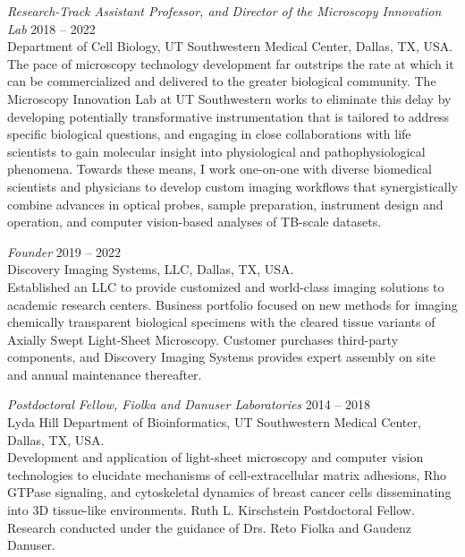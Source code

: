 {\sl Research-Track Assistant Professor, and Director of the Microscopy Innovation Lab} \hfill 2018 -- 2022 \\ 
Department of Cell Biology, UT Southwestern Medical Center, Dallas, TX, USA. \hfill \\
\forceindent The pace of microscopy technology development far outstrips the rate at which it can be commercialized and delivered to the greater biological community.  The Microscopy Innovation Lab at UT Southwestern works to eliminate this delay by developing potentially transformative instrumentation that is tailored to address specific biological questions, and engaging in close collaborations with life scientists to gain molecular insight into physiological and pathophysiological phenomena. Towards these means, I work one-on-one with diverse biomedical scientists and physicians to develop custom imaging workflows that synergistically combine advances in optical probes, sample preparation, instrument design and operation, and computer vision-based analyses of TB-scale datasets. 

{\sl Founder} \hfill 2019 -- 2022 \\ 
Discovery Imaging Systems, LLC, Dallas, TX, USA. \hfill \\
\forceindent Established an LLC to provide customized and world-class imaging solutions to academic research centers.  Business portfolio focused on new methods for imaging chemically transparent biological specimens with the cleared tissue variants of Axially Swept Light-Sheet Microscopy.  Customer purchases third-party components, and Discovery Imaging Systems provides expert assembly on site and annual maintenance thereafter.

{\sl Postdoctoral Fellow, Fiolka and Danuser Laboratories} \hfill 2014 -- 2018 \\ 
Lyda Hill Department of Bioinformatics, UT Southwestern Medical Center, Dallas, TX, USA. \hfill \\
\forceindent Development and application of light-sheet microscopy and computer vision technologies to elucidate mechanisms of cell-extracellular matrix adhesions, Rho GTPase signaling, and cytoskeletal dynamics of breast cancer cells disseminating into 3D tissue-like environments. Ruth L. Kirschstein Postdoctoral Fellow.  Research conducted under the guidance of Drs. Reto Fiolka and Gaudenz Danuser.


